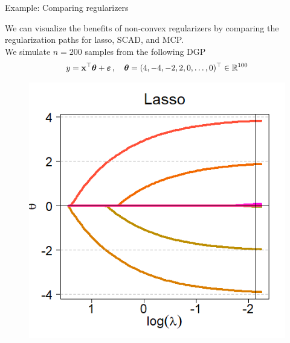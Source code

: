 \documentclass[11pt,compress,t,notes=noshow, xcolor=table]{beamer}
\begin{document}
\begin{vbframe}{Example: Comparing regularizers}

We can visualize the benefits of non-convex regularizers by comparing the regularization paths for lasso, SCAD, and MCP.\\
\vspace{0.15cm}
We simulate $n=200$ samples from the following DGP
{\small
$$y = \mathbf{x}^{\top} \bm{\theta} + \bm{\varepsilon}\,,\quad \bm{\theta} =(4,-4,-2,2,0,\ldots,0)^{\top} \in \mathbb{R}^{100}$$
}
\vspace{-1cm}

  \begin{figure}[h]
    \begin{minipage}{0.32\linewidth}
      \vspace{3pt}
      \centerline{\includegraphics[width=\textwidth]{figure_man/other-pen-lasso.png}}
    \end{minipage}
    \begin{minipage}{0.32\linewidth}
      \vspace{3pt}

\end{minipage}
\end{figure}
\end{vbframe}
\end{document}
